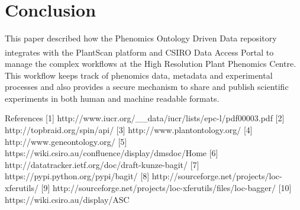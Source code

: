 \documentclass{llncs}
\begin{document}
\section{Conclusion}
This paper described how the Phenomics Ontology Driven Data repository
integrates with the PlantScan\textsuperscript{\texttrademark} platform and CSIRO Data Access Portal to manage
the complex workflows at the High Resolution Plant Phenomics Centre. This
workflow keeps track of phenomics data, metadata and experimental processes and
also provides a secure mechanism to share and publish scientific experiments in
both human and machine readable formats.




References
[1] http://www.iucr.org/\_\_data/iucr/lists/epc-l/pdf00003.pdf
[2] http://topbraid.org/spin/api/
[3] http://www.plantontology.org/
[4] http://www.geneontology.org/
[5] https://wiki.csiro.au/confluence/display/dmsdoc/Home
[6] http://datatracker.ietf.org/doc/draft-kunze-bagit/
[7] https://pypi.python.org/pypi/bagit/
[8] http://sourceforge.net/projects/loc-xferutils/
[9] http://sourceforge.net/projects/loc-xferutils/files/loc-bagger/
[10] https://wiki.csiro.au/display/ASC
\end{document}

